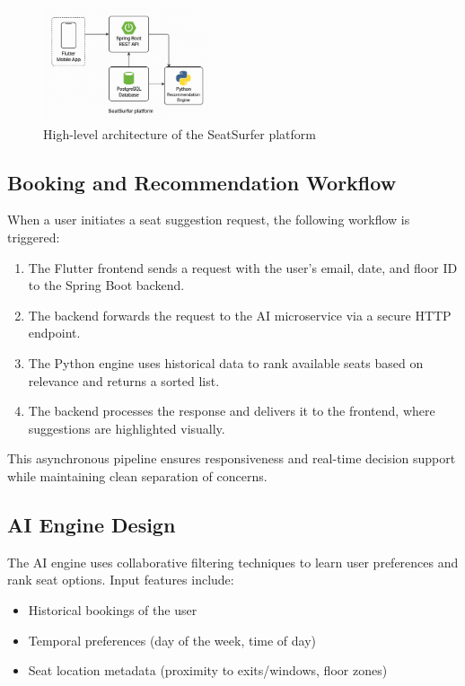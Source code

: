 \documentclass[onecolumn, 12pt]{IEEEtran}
\begin{document}
\begin{figure}[!ht]
\centering
\includegraphics[width=0.45\textwidth]{architecture_diagram.png}
\caption{High-level architecture of the SeatSurfer platform}
\label{fig:architecture}
\end{figure}

\subsection{Booking and Recommendation Workflow}

When a user initiates a seat suggestion request, the following workflow is triggered:

\begin{enumerate}
    \item The Flutter frontend sends a request with the user's email, date, and floor ID to the Spring Boot backend.
    \item The backend forwards the request to the AI microservice via a secure HTTP endpoint.
    \item The Python engine uses historical data to rank available seats based on relevance and returns a sorted list.
    \item The backend processes the response and delivers it to the frontend, where suggestions are highlighted visually.
\end{enumerate}

This asynchronous pipeline ensures responsiveness and real-time decision support while maintaining clean separation of concerns.

\subsection{AI Engine Design}

The AI engine uses collaborative filtering techniques to learn user preferences and rank seat options. Input features include:

\begin{itemize}
    \item Historical bookings of the user
    \item Temporal preferences (day of the week, time of day)
    \item Seat location metadata (proximity to exits/windows, floor zones)
\end{itemize}
\end{document}
